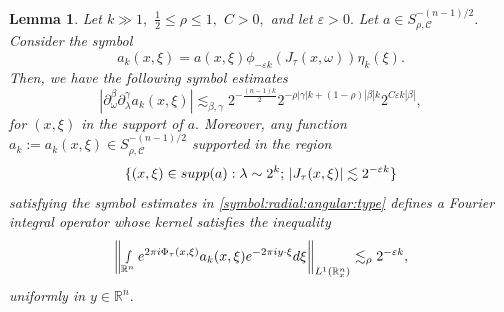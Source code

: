 \documentclass[12pt, reqno]{amsart}
\newtheorem{lemma}[theorem]{Lemma}
\theoremstyle{definition}
\theoremstyle{remark}
\numberwithin{equation}{section}
\begin{document}
\begin{lemma}\label{Fundamental:deg:lemma} Let $k\gg 1,$ $\frac{1}{2}\leq \rho\leq 1,$ $C>0,$ and let $\varepsilon>0.$ Let $a\in S^{-(n-1)/2}_{\rho,\mathscr{C}}.$ Consider the symbol 
\begin{equation}\label{symbol:a:k}
    a_{k}(x,\xi)= a(x,\xi)\phi_{-\varepsilon k}(J_{\tau}(x,\omega))\eta_{k}(\xi).
\end{equation} Then, we have the following symbol estimates
\begin{equation}\label{symbol:radial:angular:type}
    |\partial_\omega^\beta \partial_{\lambda}^\gamma a_{k}(x,\xi) |\lesssim_{\beta,\gamma} 2^{-\frac{(n-1)k}{2}}2^{-\rho|\gamma|k+(1-\rho)|\beta|k} 2^{C\varepsilon k |\beta|},
\end{equation} for $(x,\xi)$ in the support of $a.$ Moreover, any function $a_k:=a_{k}(x,\xi)\in S^{-(n-1)/2}_{\rho,\mathscr{C}}$ supported in the region
\begin{equation}\label{region:support:a:k}
  \{(x,\xi)\in \textnormal{supp}(a): \lambda\sim 2^k; \,|J_{\tau}(x,\xi)|\lesssim 2^{-\varepsilon k}\}  
\end{equation}
satisfying the symbol estimates in \eqref{symbol:radial:angular:type} defines a Fourier integral operator whose  kernel satisfies the inequality
\begin{equation}\label{First:Reduction:lemma}
    \left\Vert \smallint\limits_{\mathbb{R}^n}e^{2\pi i\Phi_\tau(x,\xi)}a_k(x,\xi)e^{-2\pi i y\cdot \xi}  d\xi  \right\Vert_{L^1(\mathbb{R}^n_x)}\lesssim_\rho 2^{-\varepsilon k},
\end{equation} uniformly in $y\in \mathbb{R}^n.$
    
\end{lemma}
\end{document}

